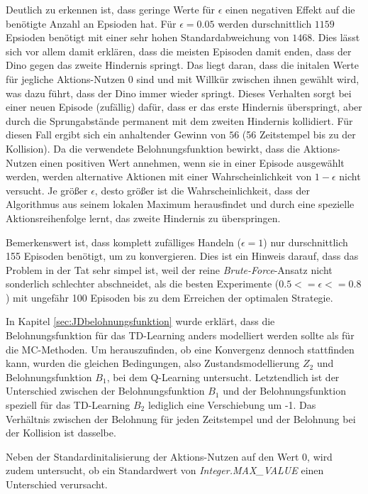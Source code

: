 Deutlich zu erkennen ist, dass geringe Werte für $\epsilon$ einen negativen Effekt auf die benötigte Anzahl an Epsioden hat. Für $\epsilon = 0.05$ werden durschnittlich $1159$ Epsioden benötigt mit einer sehr hohen Standardabweichung von $1468$. Dies lässt sich vor allem damit erklären, dass die meisten Episoden damit enden, dass der Dino gegen das zweite Hindernis springt. Das liegt daran, dass die initalen Werte für jegliche Aktions-Nutzen 0 sind und mit Willkür zwischen ihnen gewählt wird, was dazu führt, dass der Dino immer wieder springt. Dieses Verhalten sorgt bei einer neuen Episode (zufällig) dafür, dass er das erste Hindernis überspringt, aber durch die Sprungabstände permanent mit dem zweiten Hindernis kollidiert. Für diesen Fall ergibt sich ein anhaltender Gewinn von $56$ (56 Zeitstempel bis zu der Kollision). Da die verwendete Belohnungsfunktion bewirkt, dass die Aktions-Nutzen einen positiven Wert annehmen, wenn sie in einer Episode ausgewählt werden, werden alternative Aktionen mit einer Wahrscheinlichkeit von $1-\epsilon$ nicht versucht. Je größer $\epsilon$, desto größer ist die Wahrscheinlichkeit, dass der Algorithmus aus seinem lokalen Maximum herausfindet und durch eine spezielle Aktionsreihenfolge lernt, das zweite Hindernis zu überspringen.
\par
Bemerkenswert ist, dass komplett zufälliges Handeln ($\epsilon = 1$) nur durschnittlich 155 Episoden benötigt, um zu konvergieren. Dies ist ein Hinweis darauf, dass das Problem in der Tat sehr simpel ist, weil der reine \textit{Brute-Force}-Ansatz nicht sonderlich schlechter abschneidet, als die besten Experimente ($0.5 <= \epsilon <= 0.8$ ) mit ungefähr 100 Episoden bis zu dem Erreichen der optimalen Strategie.

\par 
In Kapitel \ref{sec:JDbelohnungsfunktion} wurde erklärt, dass die Belohnungsfunktion für das TD-Learning anders modelliert werden sollte als für die MC-Methoden. Um herauszufinden, ob eine Konvergenz dennoch stattfinden kann, wurden die gleichen Bedingungen, also Zustandsmodellierung $Z_2$ und Belohnungsfunktion $B_1$, bei dem Q-Learning untersucht. Letztendlich ist der Unterschied zwischen der Belohnungsfunktion $B_1$ und der Belohnungsfunktion speziell für das TD-Learning $B_2$ lediglich eine Verschiebung um -1. Das Verhältnis zwischen der Belohnung für jeden Zeitstempel und der Belohnung bei der Kollision ist dasselbe.
\par 
Neben der Standardinitalisierung der Aktions-Nutzen auf den Wert 0, wird zudem untersucht, ob ein Standardwert von \textit{Integer.MAX\_VALUE} einen Unterschied verursacht.


